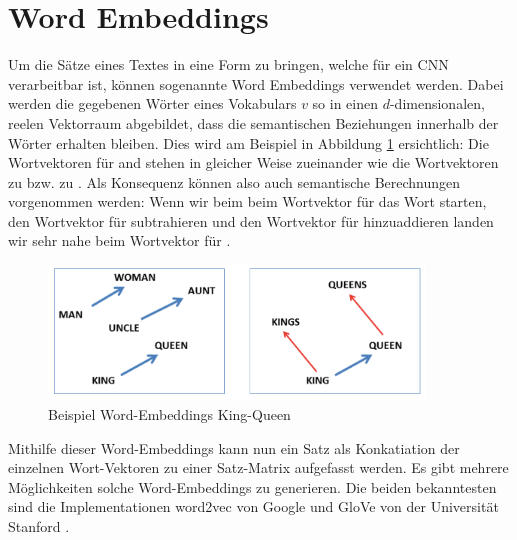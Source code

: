 \section{Word Embeddings}
Um die Sätze eines Textes in eine Form zu bringen, welche für ein CNN verarbeitbar ist, können sogenannte Word Embeddings verwendet werden. Dabei werden die gegebenen Wörter eines Vokabulars $v$ so in einen $d$-dimensionalen, reelen Vektorraum abgebildet, dass die semantischen Beziehungen innerhalb der Wörter erhalten bleiben. Dies wird am Beispiel in Abbildung \ref{basic:word_embeddings:king_queen_example} ersichtlich: Die Wortvektoren für  and  stehen in gleicher Weise zueinander wie die Wortvektoren  zu  bzw.  zu . Als Konsequenz können also auch semantische Berechnungen vorgenommen werden: Wenn wir beim beim Wortvektor für das Wort  starten, den Wortvektor für  subtrahieren und den Wortvektor für  hinzuaddieren landen wir sehr nahe beim Wortvektor für .\\

\begin{figure}[H]
	\label{basic:word_embeddings:king_queen_example}
	\centering
	\includegraphics[width=10cm]{img/king_queen_example_word_embeddings}
	\caption{Beispiel Word-Embeddings King-Queen}
\end{figure}

Mithilfe dieser Word-Embeddings kann nun ein Satz als Konkatiation der einzelnen Wort-Vektoren zu einer Satz-Matrix aufgefasst werden. Es gibt mehrere Möglichkeiten solche Word-Embeddings zu generieren. Die beiden bekanntesten sind die Implementationen word2vec von Google \cite{mikolov2013distributed} und GloVe von der Universität Stanford \cite{pennington2014glove}.

